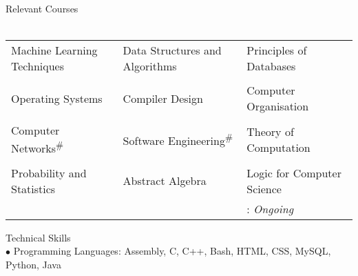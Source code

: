 \documentclass{article}
\begin{document}
{\Large Relevant Courses}\\\\
\begin{tabular}{p{6cm} p{6cm} p{6cm}}
Machine Learning Techniques & Data Structures and Algorithms & Principles of Databases\\\\\vspace{-0.4cm}Operating Systems &\vspace{-0.4cm} Compiler Design &\vspace{-0.4cm} Computer Organisation \\\\\vspace{-0.5cm}Computer Networks\textsuperscript{\#} & \vspace{-0.5cm}Software Engineering\textsuperscript{\#} & \vspace{-0.5cm}Theory of Computation\\\\
\vspace{-0.6cm}Probability and Statistics & \vspace{-0.6cm}Abstract Algebra & \vspace{-0.6cm}Logic for Computer Science\\ & & \vspace{-0.5cm}\hspace{3cm}{\#}: \emph{Ongoing}\\
\end{tabular}
{\Large Technical Skills}\\

$\bullet$ Programming Languages: Assembly, C, C++, Bash, HTML, CSS, MySQL, Python, Java \\
\end{document}
